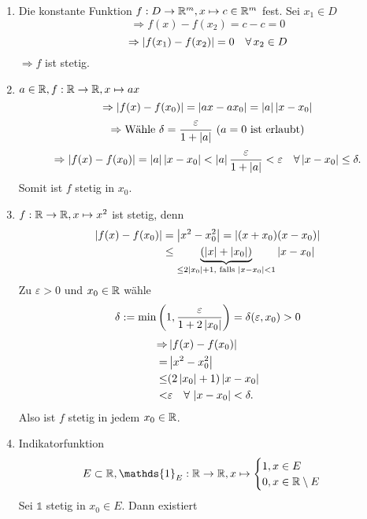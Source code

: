\documentclass[../ana1.tex]{subfiles}
\begin{document}
\begin{bspe}\leavevmode
    \begin{enumerate}
        \item Die konstante Funktion \( f: D\rightarrow \mathbb{R}^m, 
        x\mapsto c\in\mathbb{R}^m \) fest.
        Sei \( x_1\in D \)
        \[ \Rightarrow f(x) - f(x_2) = c - c = 0 \]
        \[ \Rightarrow \left|f(x_1) - f(x_2)\right| = 0 \quad \forall \, 
        x_2\in D \]
        \(\Rightarrow f\) ist stetig.
        \item \( a\in\mathbb{R}, f:\mathbb{R} \rightarrow \mathbb{R}, x\mapsto ax \)
        \[ \Rightarrow \left| f(x) - f(x_0) \right| = 
        \left| ax - ax_0 \right| = \left|a\right|\left|x-x_0\right| \]
        \[ \Rightarrow \text{Wähle }\delta = 
        \frac{\varepsilon}{1+\left|a\right|} 
        \ (a=0 \text{ ist erlaubt}) \]
        \[ \Rightarrow \left|f(x) - f(x_0)\right| = \left|a\right|
        \left|x-x_0\right| < \left|a\right| \frac{\varepsilon}{1+\left|a\right|}
        < \varepsilon \quad \forall \left|x-x_0\right| \leq \delta. \]
        Somit ist \(f\) stetig in \(x_0\).
        \item \( f:\mathbb{R}\rightarrow\mathbb{R}, x\mapsto x^2 \)
        ist stetig, denn
        \begin{align*}
            \left| f(x) - f(x_0) \right| &= \left|x^2 - x_0^2\right| 
        = \left| (x+x_0)(x-x_0) \right|\\
            &\leq \underbrace{( \left|x\right| + \left|x_0\right| )}_{
                \leq 2\left|x_0\right|+1, \text{ falls } \left|x-x_0\right| < 1
            } \left|x-x_0\right|
        \end{align*}
        Zu \( \varepsilon > 0 \) und \( x_0 \in\mathbb{R} \) wähle
        \[ \delta := \min \left(1, \frac{\varepsilon}{1 + 2\left|x_0\right|} \right)
        = \delta(\varepsilon, x_0) > 0 \]
        \begin{align*}
            \Rightarrow &\left| f(x) - f(x_0) \right|\\
            = &\left|x^2 - x_0^2\right|\\
            \leq &(2\left|x_0\right| + 1) \left|x-x_0\right|\\
            < &\varepsilon \quad \forall \, \left|x-x_0\right| < \delta.
        \end{align*}
        Also ist \(f\) stetig in jedem \( x_0\in\mathbb{R} \).
        \item Indikatorfunktion 
        \[ E\subset \R, 
        \mathds{1}_E : \R\rightarrow\R, x\mapsto 
        \begin{cases}
            1, x\in E\\
            0, x\in\R \setminus E
        \end{cases} \]
        Sei \( \mathds{1} \) stetig in \( x_0\in E \). Dann existiert

\end{enumerate}
\end{bspe}
\end{document}
